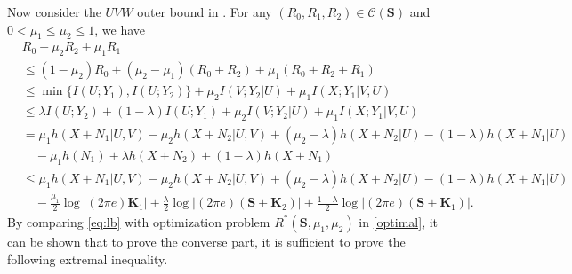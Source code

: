 \documentclass[journal,final, onecolumn]{IEEEtran}
\begin{document}
Now consider the $UVW$ outer bound in \cite[Sec. III-B]{GN14}.
For any $(R_{0},R_{1}, R_{2}) \in \mathcal{C}(\boldsymbol{S}) $ and $0 <\mu_{1} \leq \mu_{2}\leq 1$, we have
\begin{align}
& R_{0} + \mu_{2}R_{2} + \mu_{1} R_{1} \nonumber \\
&\leq  (1-\mu_{2})R_{0} +  (\mu_{2} -\mu_{1})(R_{0}+R_{2})  + \mu_{1} (R_{0}+R_{2} +R_{1})  \\
&\leq  \min \{I(U;{Y}_{1}), I(U; {Y}_{2})\} + \mu_{2} I(V; {Y}_{2} | U) + \mu_{1}I({X}; {Y}_{1} | V, U)  \\
& \leq  \lambda I(U;{Y}_{2}) + (1-\lambda) I(U; {Y}_{1}) + \mu_{2} I(V; {Y}_{2} | U) + \mu_{1}I({X}; {Y}_{1} | V, U)  \\
&= \mu_{1}h({X}+{N}_{1} | U,V) - \mu_{2} h({X}+{N}_{2} | U,V) + (\mu_{2}- \lambda) h({X}+{N}_{2} | U) - (1-\lambda) h({X}+{N}_{1} | U) \nonumber \\
 &\quad - \mu_{1}h({N}_{1}) + \lambda h({X} + {N}_{2}) + (1-\lambda) h({X}+{N}_{1})  \\
&\leq  \mu_{1}h({X}+{N}_{1} | U,V) - \mu_{2} h({X}+{N}_{2} | U,V) + (\mu_{2}- \lambda) h({X}+{N}_{2} | U) - (1-\lambda) h({X}+{N}_{1} | U) \nonumber \\
 &\quad - \frac{\mu_{1}}{2} \log \left| (2\pi e) \boldsymbol{K}_{1} \right| + \frac{\lambda}{2} \log \left| (2\pi e) (\boldsymbol{S} + \boldsymbol{K}_{2}) \right| + \frac{1-\lambda}{2} \log \left| (2\pi e) (\boldsymbol{S} + \boldsymbol{K}_{1}) \right|. \label{eq:lb}
\end{align}
By comparing \eqref{eq:lb} with optimization problem $R^{*}(\boldsymbol{S}, {\mu_1, \mu_2})$ in \eqref{optimal}, it can be shown that to prove the converse part, it is sufficient to prove the following extremal inequality.
\end{document}
